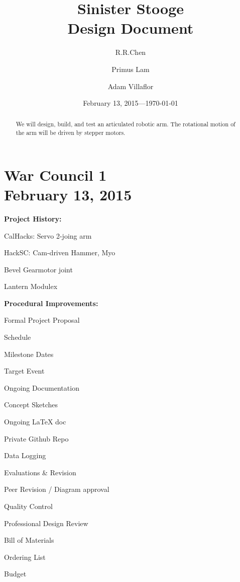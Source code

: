 \documentclass[11pt]{article}
\title{Sinister Stooge\\Design Document}
\author{R.R.Chen \and Primus Lam \and Adam Villaflor
}
\date{February 13, 2015---\today}
\begin{document}
\maketitle

\begin{abstract}
\noindent We will design, build, and test an articulated robotic arm. The rotational motion of the arm will be driven by stepper motors.
\end{abstract}

\newpage


\section{War Council 1 \\ February 13, 2015}

\noindent \textbf{Project History:}
\begin{compactitem}
	\item CalHacks: Servo 2-joing arm
	\item HackSC: Cam-driven Hammer, Myo
	\item Bevel Gearmotor joint
	\item Lantern Modulex
\end{compactitem}

\noindent \textbf{Procedural Improvements:}
\begin{compactitem}
	\item Formal Project Proposal
		\begin{compactitem}
		\item Schedule
		\item Milestone Dates
		\item Target Event
		\end{compactitem}
	\item Ongoing Documentation
		\begin{compactitem}
		\item Concept Sketches
		\item Ongoing LaTeX doc
		\item Private Github Repo
		\item Data Logging
		\end{compactitem}
	\item Evaluations \& Revision
		\begin{compactitem}
		\item Peer Revision / Diagram approval
		\item Quality Control
		\item Professional Design Review
		\end{compactitem}
	\item Bill of Materials
		\begin{compactitem}
		\item Ordering List
		\item Budget
		\end{compactitem}
\end{compactitem}
\end{document}
